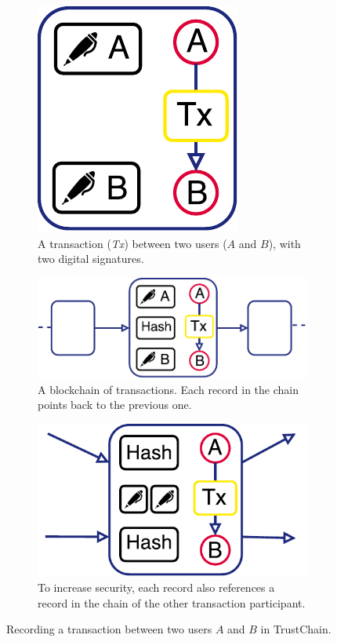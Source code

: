 \begin{figure}[b]
	\centering
	\begin{subfigure}{.5\textwidth}
		\centering
		\captionsetup{width=.9\linewidth}
		\includegraphics[width=.35\linewidth]{iom/assets/trustchain_tutorial_1}
		\caption{A transaction (\emph{Tx}) between two users ($ A $ and $ B $), with two digital signatures.}
		\label{fig:trustchain_tutorial_1}
	\end{subfigure}
	\begin{subfigure}{.5\textwidth}
		\centering
		\captionsetup{width=.9\linewidth}
		\includegraphics[width=\linewidth]{iom/assets/trustchain_tutorial_2}
		\caption{A blockchain of transactions. Each record in the chain points back to the previous one.}
		\label{fig:trustchain_tutorial_2}
	\end{subfigure}\vspace{0.3cm}%
	\begin{subfigure}{.5\textwidth}
		\centering
		\captionsetup{width=.9\linewidth}
		\includegraphics[width=.7\linewidth]{iom/assets/trustchain_tutorial_3}
		\caption{To increase security, each record also references a record in the chain of the other transaction participant.}
		\label{fig:trustchain_tutorial_3}
	\end{subfigure}
	\caption{Recording a transaction between two users $ A $ and $ B $ in TrustChain.}
	\label{fig:trustchain_tutorial}
\end{figure}

